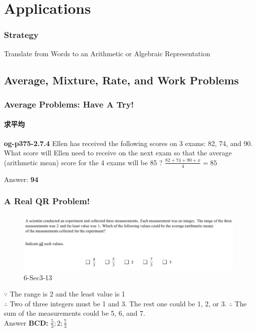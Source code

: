 \documentclass[
	11pt, %
	handout,
]{beamer}
\begin{document}

\section{Applications}


\begin{frame}
\frametitle{Strategy}
{\LARGE Translate from Words to an Arithmetic or Algebraic Representation}
\end{frame}

\subsection{Average, Mixture, Rate, and Work Problems}


\begin{frame}
	\frametitle{Average Problems: Have A Try!}
	\framesubtitle{求平均}
	\textbf{og-p375-2.7.4}
	Ellen has received the following scores on 3 exams: 82, 74, and 90. What score will Ellen need to receive on the next exam so that the average (arithmetic mean) score for the 4 exams will be 85 ?
	\pause
	$\frac{82 + 74 + 90 + x}{4} = 85$

	\pause
	Answer: \textbf{94}
\end{frame}


\begin{frame}
	\frametitle{A Real QR Problem!}
	\framesubtitle{}
	\begin{figure}
		\includegraphics[width=\linewidth]{Average_Example_Question1.png}
		\caption{6-Sec3-13}
	\end{figure}
	\pause
$\because$ The range is 2 and the least value is 1 \\ 
$\therefore$ Two of three integers must be 1 and 3. 
The rest one could be 1, 2, or 3.
$\therefore$ The sum of the measurements could be 5, 6, and 7.\\
\pause
\bigskip
Answer \textbf{BCD: } $\frac{5}{3};2;\frac{7}{3}$
\end{frame}
\end{document}
